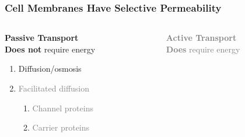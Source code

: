 \documentclass[10pt]{beamer}
\begin{document}
\begin{frame}[t]
\frametitle{Cell Membranes Have Selective Permeability}
\vspace{1.0cm}

	\begin{columns}[t]
		\begin{column}{0.5\textwidth}
			\Large{\textbf{\textcolor{myblue2}{Passive Transport}}}\normalsize{}\\
			\medskip
			\textbf{Does not} require energy\\
				\begin{enumerate}
					\item Diffusion/osmosis
					\item \textcolor{gray}{Facilitated diffusion}
						\begin{enumerate}
							\item \textcolor{gray}{Channel proteins}
							\item \textcolor{gray}{Carrier proteins}
						\end{enumerate}
				\end{enumerate}
		\end{column}
		
		\begin{column}{0.5\textwidth}
			\Large{\textbf{\textcolor{gray}{Active Transport}}}\normalsize{}\\
			\medskip
			\textcolor{gray}{\textbf{Does} require energy}\\
		\end{column}
	\end{columns}
\end{frame}
\end{document}
